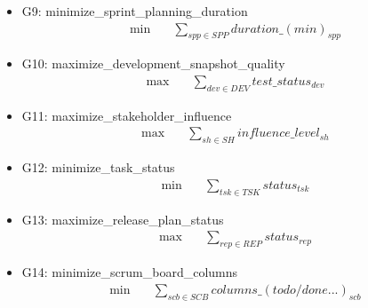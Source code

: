 \documentclass{article}
\begin{document}
\begin{itemize}
    \item G9: minimize\_sprint\_planning\_duration
        \begin{align*}
            \min \quad &\sum_{spp \in SPP} duration\_(min)_{spp}
        \end{align*}
    \item G10: maximize\_development\_snapshot\_quality
        \begin{align*}
            \max \quad &\sum_{dev \in DEV} test\_status_{dev}
        \end{align*}
    \item G11: maximize\_stakeholder\_influence
        \begin{align*}
            \max \quad &\sum_{sh \in SH} influence\_level_{sh}
        \end{align*}
    \item G12: minimize\_task\_status
        \begin{align*}
            \min \quad &\sum_{tsk \in TSK} status_{tsk}
        \end{align*}
    \item G13: maximize\_release\_plan\_status
        \begin{align*}
            \max \quad &\sum_{rep \in REP} status_{rep}
        \end{align*}
    \item G14: minimize\_scrum\_board\_columns
        \begin{align*}
            \min \quad &\sum_{scb \in SCB} columns\_(todo/done...)_{scb}
        \end{align*}
\end{itemize}
\end{document}
